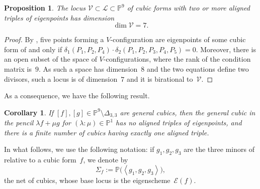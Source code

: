 \documentclass[a4paper, 11pt, reqno]{amsart}
\theoremstyle{plain}
\newtheorem{prop}[lemma]{Proposition}
\newtheorem{corollary}[lemma]{Corollary}
\theoremstyle{definition}
\newtheorem{definition}[lemma]{Definition}
\newcommand{\p}{\mathbb{P}}
\newcommand{\sL}{\mathcal{L}}
\newcommand{\sV}{\mathcal{V}}
\newcommand{\Eig}[1]{\mathcal{E}\!\left( {#1} \right)}
\begin{document}
\begin{prop}
The locus $\sV \subset \sL \subset \p^9$ of cubic forms with two or more aligned triples of eigenpoints has dimension
%
\[
  \dim \sV = 7.
\]
%
\end{prop}
\begin{proof}
By , five points forming a $V$-configuration are eigenpoints of some cubic form of and only if $\delta_1 (P_1,P_2,P_4) \cdot
\delta_2 (P_1,P_2,P_3,P_4,P_5)=0$.
Moreover, there is an open subset of the space of $V$-configurations, where the rank of the condition matrix is~$9$. 
As such a space has dimension~$8$ and the two equations define two divisors, such a locus is of dimension~$7$ and it is birational to~$\sV$.
\end{proof}

As a consequence, we have the following result.

\begin{corollary}
\label{lemma:pencil_one_aligned}
If $[f],[g] \in \p^9 \setminus \Delta_{3,3}$ are general cubics,
then the general cubic in the pencil
$\lambda f + \mu g$ for $(\lambda: \mu) \in \p^1$ has no aligned triples of eigenpoints, and there is a finite number of cubics having exactly one aligned triple.
\end{corollary}

%

In what follows, we use the following notation: if $g_1, g_2, g_3$ are the three minors of  relative
to a cubic form~$f$, we denote by
%
\[
  \Sigma_f := \p \bigl( \left\langle g_1, g_2, g_3 \right\rangle \bigr),
\]
%
the net of cubics, whose base locus is the eigenscheme~$\Eig{f}$.
\end{document}
